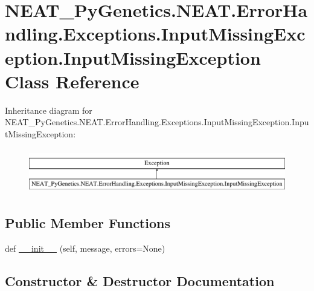 \hypertarget{classNEAT__PyGenetics_1_1NEAT_1_1ErrorHandling_1_1Exceptions_1_1InputMissingException_1_1InputMissingException}{}\section{N\+E\+A\+T\+\_\+\+Py\+Genetics.\+N\+E\+A\+T.\+Error\+Handling.\+Exceptions.\+Input\+Missing\+Exception.\+Input\+Missing\+Exception Class Reference}
\label{classNEAT__PyGenetics_1_1NEAT_1_1ErrorHandling_1_1Exceptions_1_1InputMissingException_1_1InputMissingException}
Inheritance diagram for N\+E\+A\+T\+\_\+\+Py\+Genetics.\+N\+E\+A\+T.\+Error\+Handling.\+Exceptions.\+Input\+Missing\+Exception.\+Input\+Missing\+Exception\+:\begin{figure}[H]
\begin{center}
\leavevmode
\includegraphics[height=1.971831cm]{classNEAT__PyGenetics_1_1NEAT_1_1ErrorHandling_1_1Exceptions_1_1InputMissingException_1_1InputMissingException}
\end{center}
\end{figure}
\subsection*{Public Member Functions}
\begin{DoxyCompactItemize}
\item 
def \hyperlink{classNEAT__PyGenetics_1_1NEAT_1_1ErrorHandling_1_1Exceptions_1_1InputMissingException_1_1InputMissingException_ad099b1a8bf35220cc7d2a47d4469d749}{\+\_\+\+\_\+init\+\_\+\+\_\+} (self, message, errors=None)
\end{DoxyCompactItemize}


\subsection{Constructor \& Destructor Documentation}

